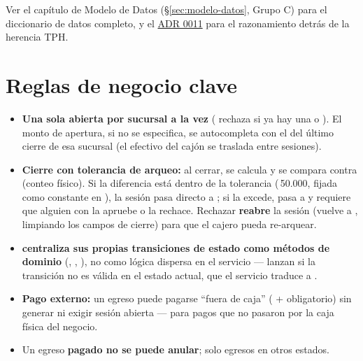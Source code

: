 Ver el capítulo de Modelo de Datos (\S\ref{sec:modelo-datos}, Grupo C) para el diccionario de datos completo, y el \hyperref[adr:0011]{ADR 0011} para el razonamiento detrás de la herencia TPH.

\section{Reglas de negocio clave}
\label{sec:caja-reglas}

\begin{itemize}
  \item \textbf{Una sola  abierta por sucursal a la vez} ( rechaza si ya hay una  o \allowbreak {}). El monto de apertura, si no se especifica, se autocompleta con el  del último cierre de esa sucursal (el efectivo del cajón se traslada entre sesiones).
  \item \textbf{Cierre con tolerancia de arqueo:} al cerrar, se calcula  y se compara contra  (conteo físico). Si la diferencia está dentro de la tolerancia (\textpm\,50.000, fijada como constante  en ), la sesión pasa directo a ; si la excede, pasa a \allowbreak {} y requiere que alguien con \allowbreak {}\allowbreak {} la apruebe o la rechace. Rechazar \textbf{reabre} la sesión (vuelve a , limpiando los campos de cierre) para que el cajero pueda re-arquear.
  \item \textbf{ centraliza sus propias transiciones de estado como métodos de dominio} (\allowbreak {}\allowbreak {}\allowbreak {}\allowbreak \code{)}, , ), no como lógica dispersa en el servicio --- lanzan \allowbreak {}\allowbreak {} si la transición no es válida en el estado actual, que el servicio traduce a \allowbreak {}.
  \item \textbf{Pago externo:} un egreso puede pagarse ``fuera de caja'' ( +  obligatorio) sin generar  ni exigir sesión abierta --- para pagos que no pasaron por la caja física del negocio.
  \item Un egreso \textbf{pagado no se puede anular}; solo egresos en otros estados.

\end{itemize}
